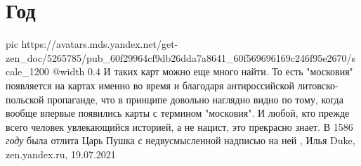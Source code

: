  
 
 
 
 
\chapter{Год}

\ifcmt
  pic https://avatars.mds.yandex.net/get-zen_doc/5265785/pub_60f29964cf9db26dda7a8641_60f569696169c246f95e2670/scale_1200
  @width 0.4
\fi
И таких карт можно еще много найти. То есть "московия" появляется на картах
именно во время и благодаря антироссийской литовско-польской пропаганде, что в
принципе довольно наглядно видно по тому, когда вообще впервые появились карты
с термином "московия". И любой, кто прежде всего человек увлекающийся историей,
а не нацист, это прекрасно знает.  В 1586 \emph{году} была отлита Царь Пушка с
недвусмысленной надписью на ней
, Илья Duke, zen.yandex.ru, 19.07.2021
